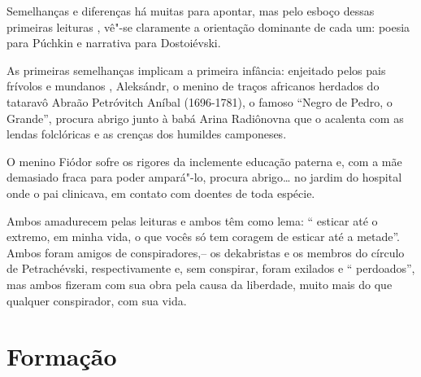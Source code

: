Semelhanças e diferenças há muitas para apontar, mas pelo esboço dessas
primeiras leituras , vê"-se claramente a orientação dominante de cada um:
poesia para Púchkin e narrativa para Dostoiévski.

As primeiras semelhanças implicam a primeira infância: enjeitado pelos
pais frívolos e mundanos , Aleksándr, o menino de traços africanos
herdados do tataravô Abraão Petróvitch Aníbal (1696-1781), o famoso
``Negro de Pedro, o Grande'', procura abrigo junto à babá Arina
Radiônovna que o acalenta com as lendas folclóricas e as crenças dos
humildes camponeses.

O menino Fiódor sofre os rigores da inclemente educação paterna e, com a
mãe demasiado fraca para poder ampará"-lo, procura abrigo\ldots{} no jardim do
hospital onde o pai clinicava, em contato com doentes de toda espécie.

Ambos amadurecem pelas leituras e ambos têm como lema: `` esticar até o
extremo, em minha vida, o que vocês só tem coragem de esticar até a
metade''. Ambos foram amigos de conspiradores,-- os dekabristas e os
membros do círculo de Petrachévski, respectivamente e, sem conspirar,
foram exilados e `` perdoados'', mas ambos fizeram com sua obra pela
causa da liberdade, muito mais do que qualquer conspirador, com sua
vida.

\section{Formação}

